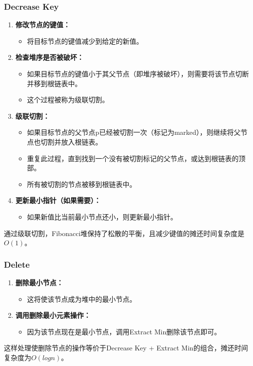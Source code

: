 \documentclass{article}
\begin{document}
\subsubsection{Decrease Key}
\begin{enumerate}
    \item \textbf{修改节点的键值：}
        \begin{itemize}
            \item 将目标节点的键值减少到给定的新值。
        \end{itemize}
    \item \textbf{检查堆序是否被破坏：}
        \begin{itemize}
            \item 如果目标节点的键值小于其父节点（即堆序被破坏），则需要将该节点切断并移到根链表中。
            \item 这个过程被称为级联切割。
        \end{itemize}
    \item \textbf{级联切割：}
        \begin{itemize}
            \item 如果目标节点的父节点p已经被切割一次（标记为marked），则继续将父节点也切割并放入根链表。
            \item 重复此过程，直到找到一个没有被切割标记的父节点，或达到根链表的顶部。
            \item 所有被切割的节点被移到根链表中。
        \end{itemize}
    \item \textbf{更新最小指针（如果需要）：}
        \begin{itemize}
            \item 如果新值比当前最小节点还小，则更新最小指针。
        \end{itemize}
\end{enumerate}
\par
通过级联切割，Fibonacci堆保持了松散的平衡，且减少键值的摊还时间复杂度是 $O(1)$。

\subsubsection{Delete}
\begin{enumerate}
    \item \textbf{删除最小节点：}
        \begin{itemize}
            \item 这将使该节点成为堆中的最小节点。
        \end{itemize}
    \item \textbf{调用删除最小元素操作：}
        \begin{itemize}
            \item 因为该节点现在是最小节点，调用Extract Min删除该节点即可。
        \end{itemize}
\end{enumerate}
\par
这样处理使删除节点的操作等价于Decrease Key + Extract Min的组合，摊还时间复杂度为$O(log n)$。
\end{document}
